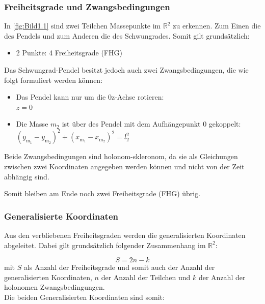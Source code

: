 \subsubsection{Freiheitsgrade und Zwangsbedingungen}

In \autoref{fig:Bild1.1} sind zwei Teilchen \bzw Massepunkte im $\mathbb{R}^2$ zu erkennen. Zum Einen die des Pendels und zum Anderen die des Schwungrades. Somit gilt grundsätzlich:

\begin{itemize}
    \item 2 Punkte: 4 Freiheitsgrade (FHG)
\end{itemize}

Das Schwungrad-Pendel besitzt jedoch auch zwei Zwangsbedingungen, die wie folgt formuliert werden können:

\begin{itemize}
    \item Das Pendel kann nur um die 0z-Achse rotieren: \\ $z = 0$
    \item Die Masse $m_2$ ist über des Pendel mit dem Aufhängepunkt 0 gekoppelt: \\ $(y_{\mathrm{m_1}} - y_{\mathrm{m_2}})^2 + (x_{\mathrm{m_1}} - x_{\mathrm{m_2}})^2 = l_2^2$
\end{itemize}

Beide Zwangsbedingungen sind holonom-skleronom, da sie als Gleichungen zwischen zwei Koordinaten angegeben werden können und nicht von der Zeit abhängig sind.

Somit bleiben am Ende noch zwei Freiheitsgrade (FHG) übrig.

\subsubsection{Generalisierte Koordinaten}

Aus den verbliebenen Freiheitsgraden werden die generalisierten Koordinaten abgeleitet. Dabei gilt grundsätzlich folgender Zusammenhang im $\mathbb{R}^2$:

\begin{equation} \label{eq:Gleichung2.6}
    \boxed{S = 2n - k}
\end{equation}
\newline
mit $S$ als Anzahl der Freiheitsgrade und somit auch der Anzahl der generalisierten Koordinaten, $n$ der Anzahl der Teilchen und $k$ der Anzahl der holonomen Zwangsbedingungen.\\
Die beiden Generalisierten Koordinaten sind somit:

